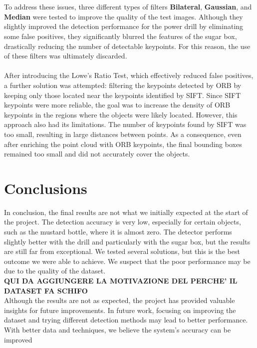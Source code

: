 \documentclass[10.5pt,a4paper]{article}
\begin{document}
\\\\
To address these issues, three different types of filters \textbf{Bilateral}, \textbf{Gaussian}, and \textbf{Median} were tested to improve the quality of the test images. Although they slightly improved the detection performance for the power drill by eliminating some false positives, they significantly blurred the features of the sugar box, drastically reducing the number of detectable keypoints. For this reason, the use of these filters was ultimately discarded.
\\\\
After introducing the Lowe's Ratio Test, which effectively reduced false positives, a further solution was attempted: filtering the keypoints detected by ORB by keeping only those located near the keypoints identified by SIFT. Since SIFT keypoints were more reliable, the goal was to increase the density of ORB keypoints in the regions where the objects were likely located. However, this approach also had its limitations. The number of keypoints found by SIFT was too small, resulting in large distances between points. As a consequence, even after enriching the point cloud with ORB keypoints, the final bounding boxes remained too small and did not accurately cover the objects.

\section*{Conclusions}
In conclusion, the final results are not what we initially expected at the start of the project. The detection accuracy is very low, especially for certain objects, such as the mustard bottle, where it is almost zero. The detector performs slightly better with the drill and particularly with the sugar box, but the results are still far from exceptional. We tested several solutions, but this is the best outcome we were able to achieve. We suspect that the poor performance may be due to the quality of the dataset.\\
\textbf{QUI DA AGGIUNGERE LA MOTIVAZIONE DEL PERCHE' IL DATASET FA SCHIFO}\\
Although the results are not as expected, the project has provided valuable insights for future improvements. In future work, focusing on improving the dataset and trying different detection methods may lead to better performance. With better data and techniques, we believe the system's accuracy can be improved
\end{document}
